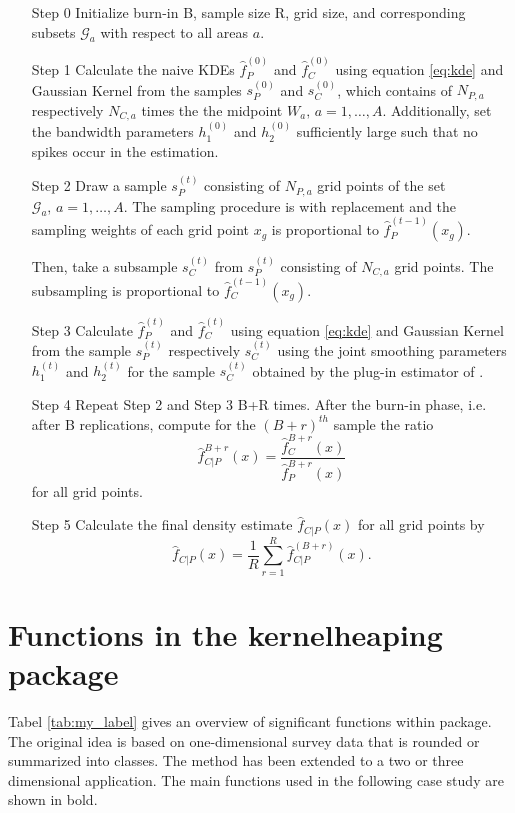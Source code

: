 \begin{itemize}
    \item[Step 0] Initialize burn-in B, sample size R, grid size, and corresponding subsets $\mathcal{G}_a$ with respect to all areas $a$.
    \item[Step 1] Calculate the naive KDEs $\hat{f}_P^{(0)}$ and $\hat{f}_C^{(0)}$ using equation \ref{eq:kde} and Gaussian Kernel from the samples $s_P^{(0)}$ and $s_C^{(0)}$, which contains of $N_{P,a}$ respectively $N_{C,a}$ times the the midpoint $W_a,\, a = 1, \dots, A$. Additionally, set the bandwidth parameters $h_1^{(0)}$ and $h_2^{(0)}$ sufficiently large such that no spikes occur in the estimation.
    \item[Step 2] Draw a sample $s_P^{(t)}$ consisting of $N_{P,a}$ grid points of the set $\mathcal{G}_a,\, a = 1, \dots, A$. The sampling procedure is with replacement and the sampling weights of each grid point $x_g$ is proportional to $\hat{f}_P^{(t-1)}(x_g)$. 

    Then, take a subsample $s_C^{(t)}$ from $s_P^{(t)}$ consisting of $N_{C,a}$ grid points. The subsampling is proportional to $\hat{f}_C^{(t-1)}(x_g)$.
    
    \item[Step 3] Calculate $\hat{f}_P^{(t)}$ and $\hat{f}_C^{(t)}$ using equation \ref{eq:kde} and Gaussian Kernel from the sample $s_P^{(t)}$ respectively $s_C^{(t)}$ using the joint smoothing parameters $h_1^{(t)}$ and $h_2^{(t)}$ for the sample $s_C^{(t)}$ obtained by the plug-in estimator of \cite{Wand94}. 
    \item[Step 4] Repeat Step 2 and Step 3 B+R times. After the burn-in phase, i.e. after B replications, compute for the $(B+r)^{th}$ sample the ratio $$ \hat{f}_{C|P}^{B+r}(x) = \frac{\hat{f}_{C}^{B+r}(x)}{\hat{f}_{P}^{B+r}(x)} $$ for all grid points. 
    \item[Step 5] Calculate the final density estimate $\hat{f}_{C|P}(x)$ for all grid points by
    $$ \hat{f}_{C|P}(x) = \frac{1}{R} \sum_{r = 1}^R \hat{f}_{C|P}^{(B+r)}(x).$$
\end{itemize}




\hypertarget{Functions-in-the-Kernelheaping-package}{%
\section{Functions in the kernelheaping package}\label{Functions-in-the-Kernelheaping-package}}

Tabel \ref{tab:my_label} gives an overview of significant functions within \hyperlink{https://cran.r-project.org/web/packages/Kernelheaping/index.html}{} package. The original idea is based on one-dimensional survey data that is rounded or summarized into classes. The method has been extended to a two or three dimensional application. The main functions used in the following case study are shown in bold. 

